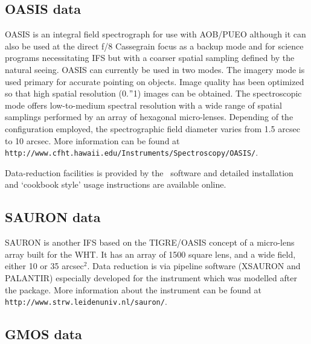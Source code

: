 \documentclass[twoside,11pt]{article}
\newcommand{\htmladdnormallink}[2]{#1}
\newcommand{\htmlref}[2]{#1}
\newcommand{\xlabel}[1]{}
\newcommand{\latex}[1]{#1}
\begin{document}
\subsection{\xlabel{sc16_oasis}OASIS data\label{sc16_oasis}}

\htmladdnormallink{OASIS}{http://www.cfht.hawaii.edu/Instruments/Spectroscopy/OASIS/}
is an integral field spectrograph for use with
\htmladdnormallink{AOB/PUEO}{http://www.cfht.hawaii.edu/Instruments/Imaging/AOB/}
although it can also be used at the direct f/8 Cassegrain focus as a
backup mode and for science programs necessitating IFS but with a
coarser spatial sampling defined by the natural seeing.  OASIS can
currently be used in two modes.  The imagery mode is used primary for
accurate pointing on objects.  Image quality has been optimized so that
high spatial resolution (0.$"$1) images can be obtained.  The
spectroscopic mode offers low-to-medium spectral resolution with a wide
range of spatial samplings performed by an array of hexagonal
micro-lenses.  Depending of the configuration employed, the
spectrographic field diameter varies from 1.5 arcsec to 10
arcsec.\latex{ More information can be found at {\tt
http://www.cfht.hawaii.edu/Instruments/Spectroscopy/OASIS/}.}

Data-reduction facilities is provided by the \htmladdnormallink{\XOASIS\
software}{http://www.cfht.hawaii.edu/Instruments/Spectroscopy/OASIS/Reduc/}
and detailed installation and `cookbook style' usage instructions
are available online.

\subsection{\xlabel{sc16_sauron}SAURON data\label{sc16_sauron}}

\htmladdnormallink{SAURON}{http://www.strw.leidenuniv.nl/sauron/}
is another IFS based on the TIGRE/\htmlref{OASIS}{sc16_oasis} concept
of a micro-lens array built for the WHT.  It has an array of 1500
square lens, and a wide field, either 10 or 35 arcsec$^2$.  Data
reduction is via pipeline software ({\footnotesize XSAURON\normalsize}
and {\footnotesize PALANTIR}\normalsize) especially developed for the
instrument which was modelled after the
\htmladdnormallink{\XOASIS}{http://www.cfht.hawaii.edu/Instruments/Spectroscopy/OASIS/Reduc/}
package.\latex{ More information about the instrument can be found
at {\tt http://www.strw.leidenuniv.nl/sauron/}.}

\subsection{\xlabel{sc16_gmos}GMOS data\label{sc16_gmos}}
\end{document}
